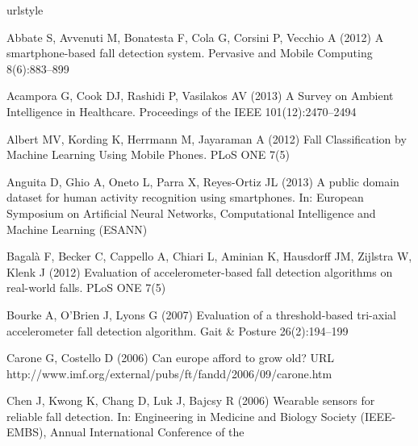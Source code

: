\documentclass[twocolumn]{svjour3}          \smartqed  \usepackage[draft]{hyperref}
\begin{document}
\begin{thebibliography}{41}
\providecommand{\natexlab}[1]{#1}
\providecommand{\url}[1]{{#1}}
\providecommand{\urlprefix}{URL }
\expandafter\ifx\csname urlstyle\endcsname\relax
  \providecommand{\doi}[1]{DOI~\discretionary{}{}{}#1}\else
  \providecommand{\doi}{DOI~\discretionary{}{}{}\begingroup
  \urlstyle{rm}\Url}\fi
\providecommand{\eprint}[2][]{\url{#2}}

Abbate S, Avvenuti M, Bonatesta F, Cola G, Corsini P, Vecchio A (2012) A
  smartphone-based fall detection system. Pervasive and Mobile Computing
  8(6):883--899

Acampora G, Cook DJ, Rashidi P, Vasilakos AV (2013) A {Survey} on {Ambient}
  {Intelligence} in {Healthcare}. Proceedings of the IEEE 101(12):2470--2494

Albert MV, Kording K, Herrmann M, Jayaraman A (2012) Fall {Classification} by
  {Machine} {Learning} {Using} {Mobile} {Phones}. PLoS ONE 7(5)

Anguita D, Ghio A, Oneto L, Parra X, Reyes-Ortiz JL (2013) A public domain
  dataset for human activity recognition using smartphones. In: {European
  Symposium on Artificial Neural Networks, Computational Intelligence and
  Machine Learning (ESANN)}

Bagalà F, Becker C, Cappello A, Chiari L, Aminian K, Hausdorff JM, Zijlstra W,
  Klenk J (2012) Evaluation of accelerometer-based fall detection algorithms on
  real-world falls. {PLoS} {ONE} 7(5)

Bourke A, O’Brien J, Lyons G (2007) Evaluation of a threshold-based tri-axial
  accelerometer fall detection algorithm. Gait \& Posture 26(2):194--199

Carone G, Costello D (2006) Can europe afford to grow old?
  \urlprefix\url{http://www.imf.org/external/pubs/ft/fandd/2006/09/carone.htm}

Chen J, Kwong K, Chang D, Luk J, Bajcsy R (2006) Wearable sensors for reliable
  fall detection. In: Engineering in {Medicine} and {Biology} {Society}
  ({IEEE}-{EMBS}), {Annual} {International} {Conference} of the


\end{thebibliography}
\end{document}
